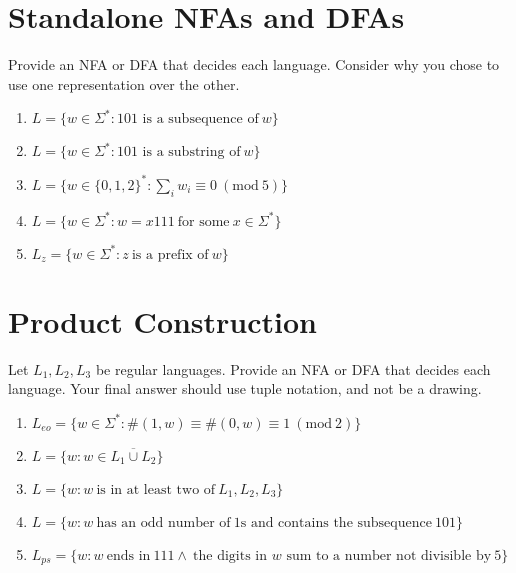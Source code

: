 \documentclass[fleqn]{article}
\begin{document}
\section{Standalone NFAs and DFAs}
Provide an NFA or DFA that decides each language. Consider why you chose to use one representation over the other.
\begin{enumerate}
    \item $L = \{w \in \Sigma^* : \text{101 is a subsequence of}~w\}$
    \item $L = \{w \in \Sigma^* : \text{101 is a substring of}~w\}$
    \item $L = \{w \in \{0,1,2\}^* : \sum_{i}w_i \equiv 0~(\text{mod}~5)\}$
    \item $L = \{w \in \Sigma^* : w = x111~\text{for some}~x \in \Sigma^*\}$
    \item $L_z = \{w \in \Sigma^* : z~\text{is a prefix of}~w\}$
\end{enumerate}

\section{Product Construction}
Let $L_1, L_2, L_3$ be regular languages. Provide an NFA or DFA that decides each language. Your final answer should use tuple notation, and not be a drawing.
\begin{enumerate}
    \item $L_{eo} = \{w \in \Sigma^* : \#(1,w) \equiv \#(0, w) \equiv 1~(\text{mod}~2)\}$
    \item $L = \{w : w \in \overline{L_1 \cup L_2}\}$
    \item $L = \{w : w~\text{is in at least two of}~L_1,L_2,L_3\}$
    \item $L = \{w : w~\text{has an odd number of}~1\text{s and contains the subsequence}~101\}$
    \item $L_{ps} = \{w : w~\text{ends in}~111\wedge ~\text{the digits in $w$ sum to a number not divisible by}~5\}$
\end{enumerate}
\end{document}
